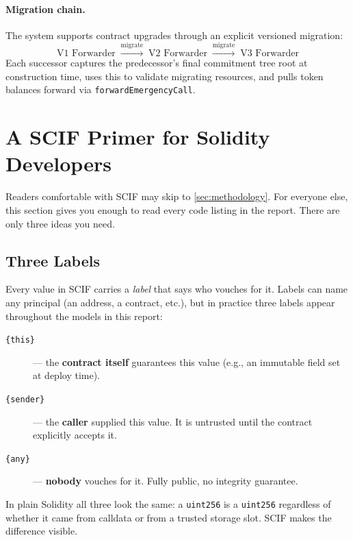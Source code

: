 \documentclass[11pt,a4paper]{article}
\begin{document}
\paragraph{Migration chain.} The system supports contract upgrades through an
explicit versioned migration:
\[
  \text{V1 Forwarder} \;\xrightarrow{\text{migrate}}\;
  \text{V2 Forwarder} \;\xrightarrow{\text{migrate}}\;
  \text{V3 Forwarder}
\]
Each successor captures the predecessor's final commitment tree root at
construction time, uses this to validate migrating resources, and pulls token
balances forward via \texttt{forwardEmergencyCall}.

\section{A SCIF Primer for Solidity Developers}
\label{sec:primer}

Readers comfortable with SCIF may skip to \cref{sec:methodology}.
For everyone else, this section gives you enough to read every code listing
in the report. There are only three ideas you need.

\subsection{Three Labels}
\label{sec:primer-labels}

Every value in SCIF carries a \emph{label} that says who vouches for it.
Labels can name any principal (an address, a contract, etc.), but in
practice three labels appear throughout the models in this report:

\begin{description}
  \item[\texttt{\{this\}}] --- the \textbf{contract itself} guarantees this
    value (e.g., an immutable field set at deploy time).
  \item[\texttt{\{sender\}}] --- the \textbf{caller} supplied this value.
    It is untrusted until the contract explicitly accepts it.
  \item[\texttt{\{any\}}] --- \textbf{nobody} vouches for it. Fully public,
    no integrity guarantee.
\end{description}

In plain Solidity all three look the same: a \texttt{uint256} is a
\texttt{uint256} regardless of whether it came from calldata or from a
trusted storage slot. SCIF makes the difference visible.
\end{document}
